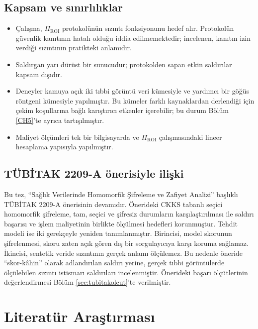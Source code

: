 \subsection{Kapsam ve sınırlılıklar}\label{kapsam}

\begin{itemize}
\item Çalışma, $\Pi_{\mathrm{ROI}}$ protokolünün sızıntı fonksiyonunu hedef alır. Protokolün güvenlik kanıtının hatalı olduğu iddia edilmemektedir; incelenen, kanıtın izin verdiği sızıntının pratikteki anlamıdır.
\item Saldırgan yarı dürüst bir sunucudur; protokolden sapan etkin saldırılar kapsam dışıdır.
\item Deneyler kamuya açık iki tıbbi görüntü veri kümesiyle ve yardımcı bir göğüs röntgeni kümesiyle yapılmıştır. Bu kümeler farklı kaynaklardan derlendiği için çekim koşullarına bağlı karıştırıcı etkenler içerebilir; bu durum Bölüm \ref{CH5}'te ayrıca tartışılmıştır.
\item Maliyet ölçümleri tek bir bilgisayarda ve $\Pi_{\mathrm{ROI}}$ çalışmasındaki lineer hesaplama yapısıyla yapılmıştır.
\end{itemize}

\subsection{TÜBİTAK 2209-A önerisiyle ilişki}\label{tubitak}

Bu tez, ``Sağlık Verilerinde Homomorfik Şifreleme ve Zafiyet Analizi'' başlıklı TÜBİTAK 2209-A önerisinin devamıdır. Önerideki CKKS tabanlı seçici homomorfik şifreleme, tam, seçici ve şifresiz durumların karşılaştırılması ile saldırı başarısı ve işlem maliyetinin birlikte ölçülmesi hedefleri korunmuştur. Tehdit modeli ise iki gerekçeyle yeniden tanımlanmıştır. Birincisi, model skorunun şifrelenmesi, skoru zaten açık gören dış bir sorgulayıcıya karşı koruma sağlamaz. İkincisi, sentetik veride sızıntının gerçek anlamı ölçülemez. Bu nedenle öneride ``skor-kâhin'' olarak adlandırılan saldırı yerine, gerçek tıbbi görüntülerde ölçülebilen sızıntı istismarı saldırıları incelenmiştir. Önerideki başarı ölçütlerinin değerlendirmesi Bölüm \ref{sec:tubitakolcut}'te verilmiştir.

\section{Literatür Araştırması}\label{literaturarastirmasi}

